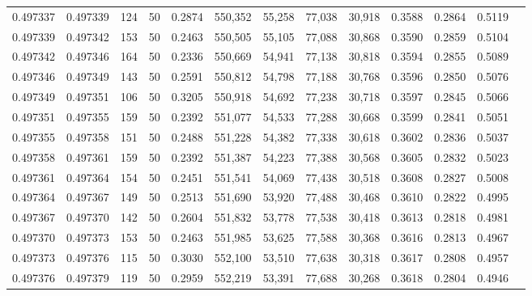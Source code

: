 \begin{tabular}{rrrrrrrrrrrrr}
0.497337 & 0.497339 &   124 &  50 &                                     0.2874 & 550,352 &  55,258 &  77,038 &  30,918 & 0.3588 & 0.2864 & 0.5119 \\
0.497339 & 0.497342 &   153 &  50 &                                     0.2463 & 550,505 &  55,105 &  77,088 &  30,868 & 0.3590 & 0.2859 & 0.5104 \\
0.497342 & 0.497346 &   164 &  50 &                                     0.2336 & 550,669 &  54,941 &  77,138 &  30,818 & 0.3594 & 0.2855 & 0.5089 \\
0.497346 & 0.497349 &   143 &  50 &                                     0.2591 & 550,812 &  54,798 &  77,188 &  30,768 & 0.3596 & 0.2850 & 0.5076 \\
0.497349 & 0.497351 &   106 &  50 &                                     0.3205 & 550,918 &  54,692 &  77,238 &  30,718 & 0.3597 & 0.2845 & 0.5066 \\
0.497351 & 0.497355 &   159 &  50 &                                     0.2392 & 551,077 &  54,533 &  77,288 &  30,668 & 0.3599 & 0.2841 & 0.5051 \\
0.497355 & 0.497358 &   151 &  50 &                                     0.2488 & 551,228 &  54,382 &  77,338 &  30,618 & 0.3602 & 0.2836 & 0.5037 \\
0.497358 & 0.497361 &   159 &  50 &                                     0.2392 & 551,387 &  54,223 &  77,388 &  30,568 & 0.3605 & 0.2832 & 0.5023 \\
0.497361 & 0.497364 &   154 &  50 &                                     0.2451 & 551,541 &  54,069 &  77,438 &  30,518 & 0.3608 & 0.2827 & 0.5008 \\
0.497364 & 0.497367 &   149 &  50 &                                     0.2513 & 551,690 &  53,920 &  77,488 &  30,468 & 0.3610 & 0.2822 & 0.4995 \\
0.497367 & 0.497370 &   142 &  50 &                                     0.2604 & 551,832 &  53,778 &  77,538 &  30,418 & 0.3613 & 0.2818 & 0.4981 \\
0.497370 & 0.497373 &   153 &  50 &                                     0.2463 & 551,985 &  53,625 &  77,588 &  30,368 & 0.3616 & 0.2813 & 0.4967 \\
0.497373 & 0.497376 &   115 &  50 &                                     0.3030 & 552,100 &  53,510 &  77,638 &  30,318 & 0.3617 & 0.2808 & 0.4957 \\
0.497376 & 0.497379 &   119 &  50 &                                     0.2959 & 552,219 &  53,391 &  77,688 &  30,268 & 0.3618 & 0.2804 & 0.4946 \\

\end{tabular}

